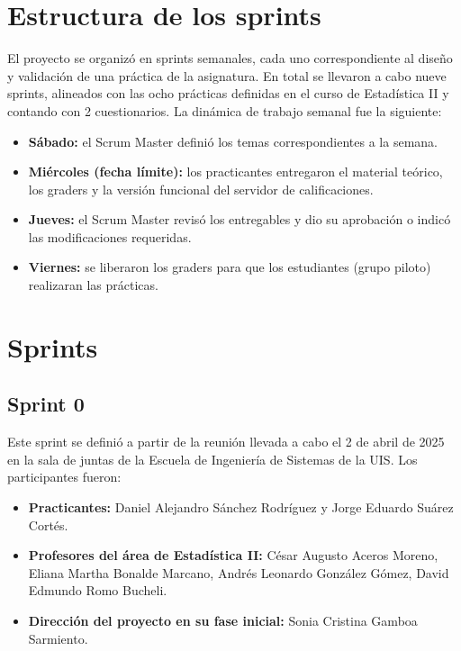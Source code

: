 \documentclass[letter,oneside,12pt,spanish]{report}
\begin{document}
\section{Estructura de los sprints}

El proyecto se organizó en sprints semanales, cada uno correspondiente al diseño y validación de una práctica de la asignatura. En total se llevaron a cabo nueve sprints, alineados con las ocho prácticas definidas en el curso de Estadística II y contando con 2 cuestionarios. La dinámica de trabajo semanal fue la siguiente:

\begin{itemize}
	\item \textbf{Sábado:} el Scrum Master definió los temas correspondientes a la semana.  
	\item \textbf{Miércoles (fecha límite):} los practicantes entregaron el material teórico, los graders y la versión funcional del servidor de calificaciones.  
	\item \textbf{Jueves:} el Scrum Master revisó los entregables y dio su aprobación o indicó las modificaciones requeridas.  
	\item \textbf{Viernes:} se liberaron los graders para que los estudiantes (grupo piloto) realizaran las prácticas.  
\end{itemize}

\section{Sprints}

\subsection{Sprint 0}

Este sprint se definió a partir de la reunión llevada a cabo el 2 de abril de 2025 en la sala de juntas de la Escuela de Ingeniería de Sistemas de la UIS. Los participantes fueron:

\begin{itemize}
	\item \textbf{Practicantes:} Daniel Alejandro Sánchez Rodríguez y Jorge Eduardo Suárez Cortés.
	\item \textbf{Profesores del área de Estadística II:} César Augusto Aceros Moreno, Eliana Martha Bonalde Marcano, Andrés Leonardo González Gómez, David Edmundo Romo Bucheli.
	\item \textbf{Dirección del proyecto en su fase inicial:} Sonia Cristina Gamboa Sarmiento.
\end{itemize}
\end{document}
